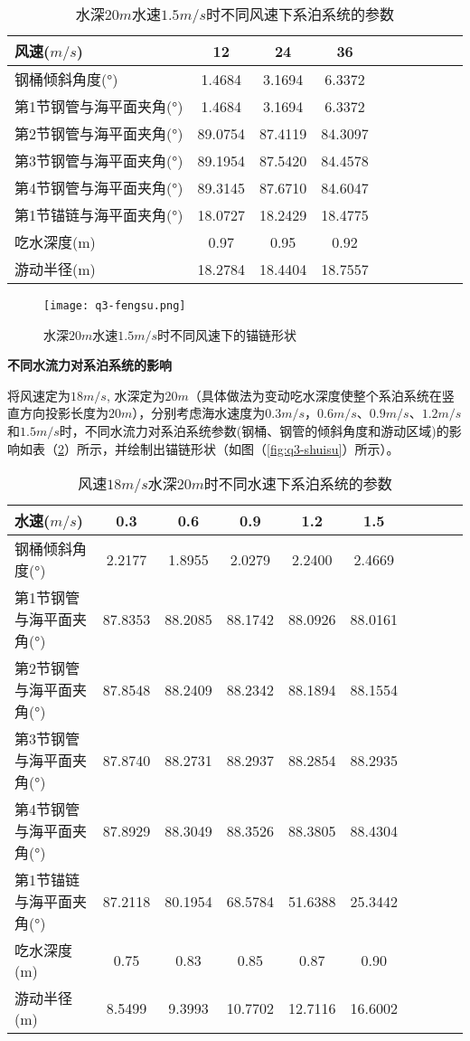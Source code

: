 \documentclass[withoutpreface,bwprint]{cumcmthesis} %
\begin{document}
\begin{table}[!htbp]
\centering
\caption{水深$20m$水速$1.5m/s$时不同风速下系泊系统的参数}
\label{q3-ans-table2}
\begin{tabular}{lccccccccc}
\toprule
风速($m/s$)&12&24&36\\
\midrule
钢桶倾斜角度(°)&1.4684&3.1694&6.3372\\
第1节钢管与海平面夹角(°)&1.4684&3.1694&6.3372\\
第2节钢管与海平面夹角(°)&89.0754&87.4119&84.3097\\
第3节钢管与海平面夹角(°)&89.1954&87.5420&84.4578\\
第4节钢管与海平面夹角(°)&89.3145&87.6710&84.6047\\
第1节锚链与海平面夹角(°)&18.0727&18.2429&18.4775\\
吃水深度(m)&0.97&0.95&0.92\\
游动半径(m)&18.2784&18.4404&18.7557\\
\bottomrule 
\end{tabular}
\end{table}

\begin{figure}[h]
\small
\centering
\texttt{[image: q3-fengsu.png]}
\caption{水深$20m$水速$1.5m/s$时不同风速下的锚链形状} \label{fig:q3-fengsu}
\end{figure}

\newpage
\textbf{不同水流力对系泊系统的影响}
\par 将风速定为$18m/s$, 水深定为$20m$（具体做法为变动吃水深度使整个系泊系统在竖直方向投影长度为$20m$），分别考虑海水速度为$0.3m/s$，$0.6m/s$、$0.9m/s$、$1.2m/s$和$1.5m/s$时，不同水流力对系泊系统参数(钢桶、钢管的倾斜角度和游动区域)的影响如表（\ref{q3-ans-table3}）所示，并绘制出锚链形状（如图（\ref{fig:q3-shuisu}）所示）。


\begin{table}[!htbp]
\centering
\caption{风速$18m/s$水深$20m$时不同水速下系泊系统的参数}
\label{q3-ans-table3}
\begin{tabular}{lccccccccc}
\toprule
水速($m/s$)&0.3&0.6&0.9&1.2&1.5\\
\midrule
钢桶倾斜角度(°)&2.2177&1.8955&2.0279&2.2400&2.4669\\
第1节钢管与海平面夹角(°)&87.8353&88.2085&88.1742&88.0926&88.0161\\
第2节钢管与海平面夹角(°)&87.8548&88.2409&88.2342&88.1894&88.1554\\
第3节钢管与海平面夹角(°)&87.8740&88.2731&88.2937&88.2854&88.2935\\
第4节钢管与海平面夹角(°)&87.8929&88.3049&88.3526&88.3805&88.4304\\
第1节锚链与海平面夹角(°)&87.2118&80.1954&68.5784&51.6388&25.3442\\
吃水深度(m)&0.75&0.83&0.85&0.87&0.90\\
游动半径(m)&8.5499&9.3993&10.7702&12.7116&16.6002\\
\bottomrule 
\end{tabular}
\end{table}
\end{document}
